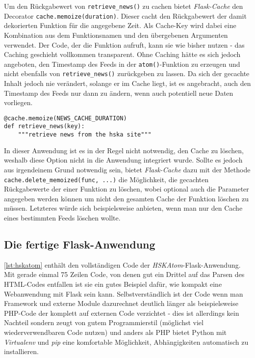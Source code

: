 Um den Rückgabewert von \lstinline{retrieve_news()} zu cachen bietet \emph{Flask-Cache} den
Decorator \lstinline{cache.memoize(duration)}. Dieser cacht den Rückgabewert der damit dekorierten
Funktion für die angegebene Zeit. Als Cache-Key wird dabei eine Kombination aus dem Funktionsnamen
und den übergebenen Argumenten verwendet. Der Code, der die Funktion aufruft, kann sie wie bisher
nutzen - das Caching geschieht vollkommen transparent. Ohne Caching hätte es sich jedoch angeboten,
den Timestamp des Feeds in der \lstinline{atom()}-Funktion zu erzeugen und nicht ebenfalls von
\lstinline{retrieve_news()} zurückgeben zu lassen. Da sich der gecachte Inhalt jedoch nie verändert,
solange er im Cache liegt, ist es angebracht, auch den Timestamp des Feeds nur dann zu ändern, wenn
auch potentiell neue Daten vorliegen.


\begin{lstlisting}[caption=HSKAtom - Cache,label=lst:hskatom-cache]
@cache.memoize(NEWS_CACHE_DURATION)
def retrieve_news(key):
    """retrieve news from the hska site"""
\end{lstlisting}

In dieser Anwendung ist es in der Regel nicht notwendig, den Cache zu löschen, weshalb diese Option
nicht in die Anwendung integriert wurde. Sollte es jedoch aus irgendeinem Grund notwendig sein,
bietet \emph{Flask-Cache} dazu mit der Methode \lstinline{cache.delete_memoized(func, ...)}
die Möglichkeit, die gecachten Rückgabewerte der einer Funktion zu löschen, wobei optional auch die
Parameter angegeben werden können um nicht den gesamten Cache der Funktion löschen zu müssen.
Letzteres würde sich beispielsweise anbieten, wenn man nur den Cache eines bestimmten Feeds löschen
wollte.

\subsection{Die fertige Flask-Anwendung}

\autoref{lst:hskatom} enthält den vollständigen Code der \emph{HSKAtom}-Flask-Anwendung. Mit gerade
einmal 75 Zeilen Code, von denen gut ein Drittel auf das Parsen des HTML-Codes entfallen ist sie ein
gutes Beispiel dafür, wie kompakt eine Webanwendung mit Flask sein kann. Selbstverständlich ist der
Code wenn man Framework und externe Module dazurechnet deutlich länger als beispielsweise PHP-Code
der komplett auf externen Code verzichtet - dies ist allerdings kein Nachteil sondern zeugt von
gutem Programmierstil (möglichst viel wiederverwendbaren Code nutzen) und anders als PHP bietet
Python mit \emph{Virtualenv} und \emph{pip} eine komfortable Möglichkeit, Abhängigkeiten automatisch
zu installieren.


